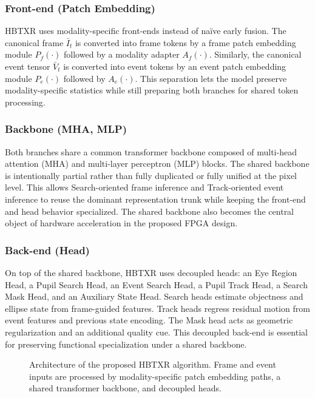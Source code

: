 \documentclass[journal]{IEEEtran}
\newcommand{\placeholderfigure}[2]{%
  \fbox{\parbox[c][#2][c]{#1}{\centering\vspace{2mm}\textbf{Figure placeholder}\\Final artwork pending\vspace{2mm}}}}
\begin{document}
\subsubsection{Front-end (Patch Embedding)}
HBTXR uses modality-specific front-ends instead of naïve early fusion. The canonical frame $\bar I_t$ is converted into frame tokens by a frame patch embedding module $P_f(\cdot)$ followed by a modality adapter $A_f(\cdot)$. Similarly, the canonical event tensor $\bar V_t$ is converted into event tokens by an event patch embedding module $P_e(\cdot)$ followed by $A_e(\cdot)$. This separation lets the model preserve modality-specific statistics while still preparing both branches for shared token processing.

\subsubsection{Backbone (MHA, MLP)}
Both branches share a common transformer backbone composed of multi-head attention (MHA) and multi-layer perceptron (MLP) blocks. The shared backbone is intentionally partial rather than fully duplicated or fully unified at the pixel level. This allows Search-oriented frame inference and Track-oriented event inference to reuse the dominant representation trunk while keeping the front-end and head behavior specialized. The shared backbone also becomes the central object of hardware acceleration in the proposed FPGA design.

\subsubsection{Back-end (Head)}
On top of the shared backbone, HBTXR uses decoupled heads: an Eye Region Head, a Pupil Search Head, an Event Search Head, a Pupil Track Head, a Search Mask Head, and an Auxiliary State Head. Search heads estimate objectness and ellipse state from frame-guided features. Track heads regress residual motion from event features and previous state encoding. The Mask head acts as geometric regularization and an additional quality cue. This decoupled back-end is essential for preserving functional specialization under a shared backbone.

\begin{figure}[t]
\centering
\placeholderfigure{0.92\columnwidth}{1.18in}
\caption{Architecture of the proposed HBTXR algorithm. Frame and event inputs are processed by modality-specific patch embedding paths, a shared transformer backbone, and decoupled heads.}
\label{fig:algo}
\end{figure}
\end{document}
